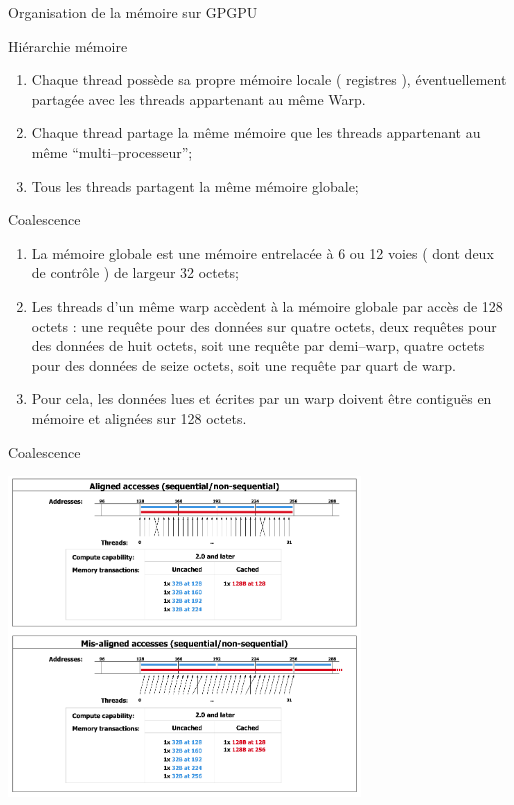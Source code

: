 \documentclass[handout,francais]{beamer}
\begin{document}
\begin{frame}[fragile]{Organisation de la mémoire sur GPGPU}
\scriptsize
 \begin{block}{Hiérarchie mémoire}
 \begin{enumerate}
  \item Chaque thread possède sa propre mémoire locale ( registres ), éventuellement
  partagée avec les threads appartenant au même Warp.
  \item Chaque thread partage la même mémoire que les threads appartenant au même 
  ``multi--processeur'';
  \item Tous les threads partagent la même mémoire globale;
 \end{enumerate}
 \end{block}

 \begin{block}{Coalescence}
  \begin{enumerate}
   \item La mémoire globale est une mémoire entrelacée à 6 ou 12 voies ( dont deux de contrôle )
   de largeur 32 octets;
   \item Les threads d'un même warp accèdent à la mémoire globale par accès de 128 octets : une requête pour
   des données sur quatre octets, deux requêtes
   pour des données de huit octets, soit une requête par demi--warp, quatre octets pour des données de seize octets,
   soit une requête par quart de warp. 
   \item Pour cela, les données lues et écrites par un warp doivent être contiguës en mémoire et alignées sur
   128 octets.
  \end{enumerate}

 \end{block}
\end{frame}

\begin{frame}[fragile]{Coalescence}
\begin{center}
\includegraphics[width=0.7\textwidth]{Coalescence}
\end{center}
\end{frame}
\end{document}
